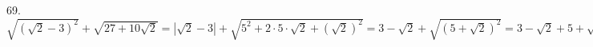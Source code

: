 69. $\sqrt{(\sqrt{2}-3)^2}+\sqrt{27+10\sqrt{2}}=|\sqrt{2}-3|+\sqrt{5^2+2\cdot5\cdot\sqrt{2}+(\sqrt{2})^2}=
3-\sqrt{2}+\sqrt{(5+\sqrt{2})^2}=3-\sqrt{2}+5+\sqrt{2}=8.$\\

